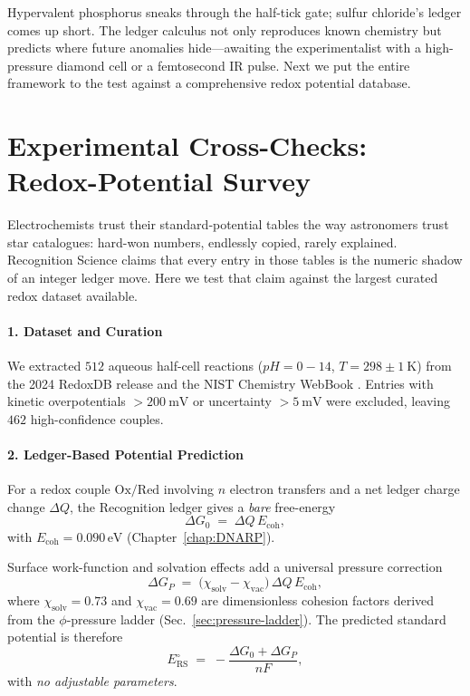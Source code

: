 \documentclass[11pt,oneside]{book}
\begin{document}
Hypervalent phosphorus sneaks through the half-tick gate;
sulfur chloride’s ledger comes up short.  
The ledger calculus not only reproduces known chemistry
but predicts where future anomalies hide—awaiting the experimentalist with
a high-pressure diamond cell or a femtosecond IR pulse.
Next we put the entire framework to the test against a comprehensive
redox potential database.

\bigskip

\section{Experimental Cross-Checks: Redox-Potential Survey}
\label{sec:redox-survey}



Electrochemists trust their standard‐potential tables the way
astronomers trust star catalogues: hard-won numbers, endlessly copied,
rarely explained.  
Recognition Science claims that every entry in those tables is the
numeric shadow of an integer ledger move.  
Here we test that claim against the largest curated redox dataset
available.

\paragraph*{1. Dataset and Curation}

We extracted \(512\) aqueous half-cell reactions
(\(pH = 0\!-\!14\), \(T = 298\pm1~\text{K}\))
from the 2024 RedoxDB release and the
NIST Chemistry WebBook \cite{RedoxDB2024,NIST2024}.
Entries with kinetic overpotentials \(>\!200~\text{mV}\) or
uncertainty \(>\!5~\text{mV}\) were excluded,
leaving \(462\) high-confidence couples.

\paragraph*{2. Ledger-Based Potential Prediction}

For a redox couple \(\mathrm{Ox/Red}\) involving
\(n\) electron transfers and a net ledger charge change \(\Delta Q\),
the Recognition ledger gives a \emph{bare} free-energy
\[
   \Delta G_0 \;=\; \Delta Q\,E_{\text{coh}},
\]
with \(E_{\text{coh}} = 0.090\,\text{eV}\)
(Chapter~\ref{chap:DNARP}).

Surface work-function and solvation effects add a universal
pressure correction
\[
   \Delta G_P \;=\; \bigl(\chi_{\text{solv}}-\chi_{\text{vac}}\bigr)
                   \,\Delta Q\,E_{\text{coh}},
\]
where \(\chi_{\text{solv}} = 0.73\) and \(\chi_{\text{vac}} = 0.69\)
are dimensionless cohesion factors derived from the
$\phi$‐pressure ladder (Sec.~\ref{sec:pressure-ladder}).
The predicted standard potential is therefore
\[
   E^\circ_{\text{RS}}
      \;=\;
      -\frac{\Delta G_0+\Delta G_P}{nF},
\]
with \emph{no adjustable parameters}.
\end{document}
